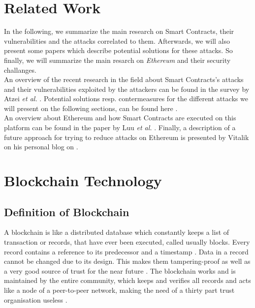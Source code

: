 \section{Related Work}
In the following, we summarize the main research on Smart Contracts, their  vulnerabilities and the attacks correlated to them. Afterwards, we will also present some papers which describe potential solutions for these attacks. So finally, we will summarize the main resarch on \textit{Ethereum} and their security challanges. \\
An overview of the recent research in the field about Smart Contracts's attacks and their vulnerabilities exploited by the attackers can be found in the survey by Atzei \textit{et al.} \cite{paper2}. Potential solutions resp. contermeasures for the different attacks we will present on the following sections, can be found here \cite{ paper2, ok, hardfork, timmedCommitments1, koetXD}. \\
An overview about Ethereum and how Smart Contracts are executed on this platform can be found in the paper by Luu \textit{et al.} \cite{paper1}. Finally, a description of a future approach for trying to reduce attacks on Ethereum is presented by Vitalik on his personal blog on \cite{challenge2, challenge3}. 





\section{Blockchain Technology}
\subsection{Definition of Blockchain}
A blockchain is like a distributed database which constantly keeps a list of transaction or records, that have ever been executed, called usually blocks. Every record contains a reference to its predecessor and a timestamp \cite{wikipedia1}.
Data in a record cannot be changed due to its design. This makes them tampering-proof as well as a very good source of trust for the near future \cite{blockchain3}.
The blockchain works and is maintained by the entire community, which keeps and verifies all records and acts like a node of a peer-to-peer network, making the need of a thirty part trust organisation useless \cite{blockchain0}.
